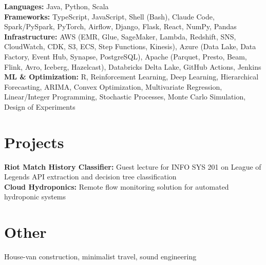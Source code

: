 \documentclass[10pt,letterpaper]{article}
\begin{document}
\textbf{Languages:} Java, Python, Scala\\[2pt]
\textbf{Frameworks:} TypeScript, JavaScript, Shell (Bash), Claude Code, Spark/PySpark, PyTorch, Airflow, Django, Flask, React, NumPy, Pandas\\[2pt]
\textbf{Infrastructure:} AWS (EMR, Glue, SageMaker, Lambda, Redshift, SNS, CloudWatch, CDK, S3, ECS, Step Functions, Kinesis), Azure (Data Lake, Data Factory, Event Hub, Synapse, PostgreSQL), Apache (Parquet, Presto, Beam, Flink, Avro, Iceberg, Hazelcast), Databricks Delta Lake, GitHub Actions, Jenkins\\[2pt]
\textbf{ML \& Optimization:} R, Reinforcement Learning, Deep Learning, Hierarchical Forecasting, ARIMA, Convex Optimization, Multivariate Regression, Linear/Integer Programming, Stochastic Processes, Monte Carlo Simulation, Design of Experiments

\section{Projects}

\textbf{Riot Match History Classifier:} Guest lecture for INFO SYS 201 on League of Legends API extraction and decision tree classification\\[2pt]
\textbf{Cloud Hydroponics:} Remote flow monitoring solution for automated hydroponic systems

\section{Other}

House-van construction, minimalist travel, sound engineering
\end{document}
